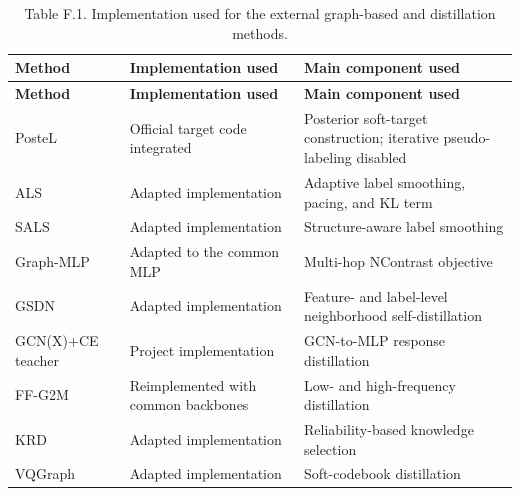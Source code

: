 \begin{longtable}[]{@{}
  >{\raggedright\arraybackslash}p{}
  >{\raggedright\arraybackslash}p{}
  >{\raggedright\arraybackslash}p{}@{}}
\caption{Table F.1. Implementation used for the external graph-based and distillation methods.}\tabularnewline
\toprule\noalign{}
\begin{minipage}[b]{\linewidth}\raggedright
\textbf{Method}
\end{minipage} & \begin{minipage}[b]{\linewidth}\centering
\textbf{Implementation used}
\end{minipage} & \begin{minipage}[b]{\linewidth}\centering
\textbf{Main component used}
\end{minipage} \\
\midrule\noalign{}
\endfirsthead
\toprule\noalign{}
\begin{minipage}[b]{\linewidth}\raggedright
\textbf{Method}
\end{minipage} & \begin{minipage}[b]{\linewidth}\centering
\textbf{Implementation used}
\end{minipage} & \begin{minipage}[b]{\linewidth}\centering
\textbf{Main component used}
\end{minipage} \\
\midrule\noalign{}
\endhead
\bottomrule\noalign{}
\endlastfoot
PosteL & Official target code integrated & Posterior soft-target construction; iterative pseudo-labeling disabled \\
ALS & Adapted implementation & Adaptive label smoothing, pacing, and KL term \\
SALS & Adapted implementation & Structure-aware label smoothing \\
Graph-MLP & Adapted to the common MLP & Multi-hop NContrast objective \\
GSDN & Adapted implementation & Feature- and label-level neighborhood self-distillation \\
GCN(X)+CE teacher & Project implementation & GCN-to-MLP response distillation \\
FF-G2M & Reimplemented with common backbones & Low- and high-frequency distillation \\
KRD & Adapted implementation & Reliability-based knowledge selection \\
VQGraph & Adapted implementation & Soft-codebook distillation \\
\end{longtable}


